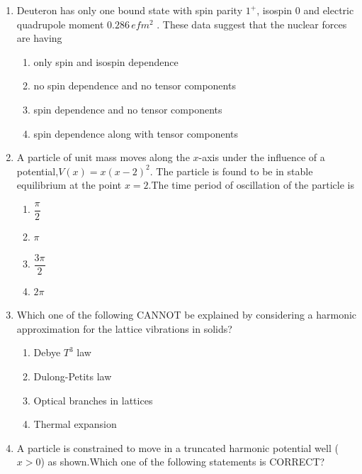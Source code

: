 \documentclass[journal,12pt,onecolumn]{IEEEtran}
\theoremstyle{remark}
\begin{document}
\begin{enumerate}
\begin{figure}[H]
    \caption*{}
    \label{fig:Q20(2)}
\end{figure}
\item Deuteron has only one bound state with spin parity $1^+$, isospin 0 and electric quadrupole moment $0.286\, efm^2$ . These data suggest that the nuclear forces are having
\begin{enumerate}
    \item only spin and isospin dependence
    \item no spin dependence and no tensor components
    \item spin dependence and no tensor components 
    \item spin dependence along with tensor components
\end{enumerate}


\item A particle of unit mass moves along the $x$-axis under the influence of a potential,$V(x)=x(x-2)^{2}$. The particle is found to be in stable equilibrium at the point $x=2$.The time period of oscillation of the particle is
\begin{multicols}{4}
\begin{enumerate}
\item $\dfrac{\pi}{2}$
\item $\pi$
\item $\dfrac{3\pi}{2}$
\item $2\pi$
\end{enumerate}
\end{multicols}

\item Which one of the following CANNOT be explained by considering a harmonic approximation
for the lattice vibrations in solids?
\begin{multicols}{2}
\begin{enumerate}
\item Debye $T^{3}$ law
\item Dulong-Petits law
\item Optical branches in lattices
\item Thermal expansion
\end{enumerate}
\end{multicols}

\item A particle is constrained to move in a truncated harmonic potential well ($x>0$) as shown.Which one of the following statements is CORRECT?


\end{enumerate}
\end{document}
